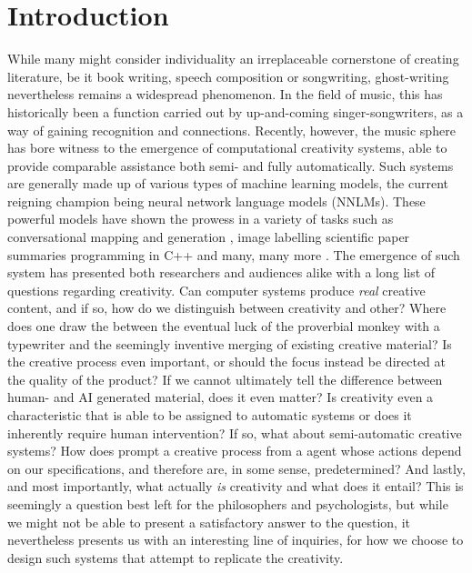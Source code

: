 \label{chap:introduction}
\section{Introduction}

While many might consider individuality an irreplaceable cornerstone of creating literature, be it book writing, speech composition or songwriting, ghost-writing nevertheless remains a widespread phenomenon. In the field of music, this has historically been a function carried out by up-and-coming singer-songwriters, as a way of gaining recognition and connections. Recently, however, the music sphere has bore witness to the emergence of computational creativity systems, able to provide comparable assistance both semi- and fully automatically. Such systems are generally made up of various types of machine learning models, the current reigning champion being neural network language models (NNLMs). These powerful models have shown the prowess in a variety of tasks such as conversational mapping and generation \cite{VinyalsOriol2015ANCM}, image labelling \cite{Egmont-PetersenM.2002Ipwn} scientific paper summaries \cite{CollinsEd2017ASAt} programming in C++ \cite{karpathy_2015} and many, many more \cite{BrownTomB2020LMaF}. The emergence of such system has presented both researchers and audiences alike with a long list of questions regarding creativity. Can computer systems produce \textit{real} creative content, and if so, how do we distinguish between creativity and other? Where does one draw the between the eventual luck of the proverbial monkey with a typewriter and the seemingly inventive merging of existing creative material? Is the creative process even important, or should the focus instead be directed at the quality of the product? If we cannot ultimately tell the difference between human- and AI generated material, does it even matter? Is creativity even a characteristic that is able to be assigned to automatic systems or does it inherently require human intervention? If so, what about semi-automatic creative systems? How does prompt a creative process from a agent whose actions depend on our specifications, and therefore are, in some sense, predetermined? And lastly, and most importantly, what actually \textit{is} creativity and what does it entail?
This is seemingly a question best left for the philosophers and psychologists, but while we might not be able to present a satisfactory answer to the question, it nevertheless presents us with an interesting line of inquiries, for how we choose to design such systems that attempt to replicate the creativity.

